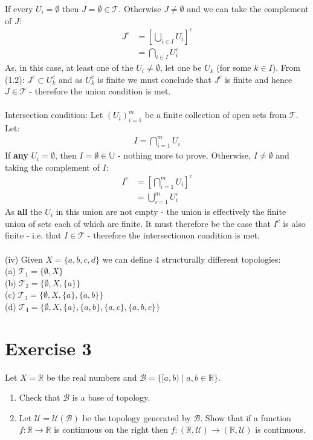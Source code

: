 \documentclass[12pt]{article}
\begin{document}
If every $U_i = \emptyset$ then $J= \emptyset \in \mathcal{T}$.  Otherwise $J \ne \emptyset$ and we can take the complement of $J$:
\begin{align*}
J^c &= \left[\bigcup_{i \in I} U_i\right]^c \\
&=\bigcap_{i \in I} U_i^c \tag{1.2}
\end{align*}
As, in this case, at least one of the $U_i \ne \emptyset$, let one be $U_k$ (for some $k \in I$).  From (1.2): $J^c \subset U_k^c$ and as $U_k^c$ is 
finite we must conclude that $J^c$ is finite and hence $J \in \mathcal{T}$ - therefore the union condition is met.\\
\\
Intersection condition: Let $(U_i)_{i=1}^m$ be a finite collection of open sets from $\mathcal{T}$.  Let:
\begin{align*}
I = \bigcap_{i=1}^m U_i \tag{1.2}
\end{align*}
If \textbf{any} $U_i = \emptyset$, then $I=\emptyset \in \mathbb{U}$ - nothing more to prove.  Otherwise, $I \ne \emptyset$ and taking the complement of $I$:
\begin{align*}
I^c &= \left[\bigcap_{i=1}^m U_i \right]^c \\
&= \bigcup_{i=1}^m U_i^c
\end{align*}
As \textbf{all} the $U_i$ in this union are not empty - the union is effectively the finite union of sets each of which are finite.
It must therefore be the case that $I^c$ is also finite - i.e. that $I \in \mathcal{T}$ - therefore the intersectionon condition is met.\\
\\
(iv) Given $X=\{a,b,c,d\}$ we can define 4 structurally different topologies:\\
(a) $\mathcal{T}_1 =\{\emptyset, X\}$\\
(b) $\mathcal{T}_2 =\{\emptyset, X, \{a\}\}$\\
(c) $\mathcal{T}_3 =\{\emptyset, X, \{a\}, \{a,b\}\}$\\
(d) $\mathcal{T}_4 =\{\emptyset, X, \{a\}, \{a,b\}, \{a,c\}, \{a,b,c\}\}$

\newpage
\noindent
\section*{Exercise 3}
Let \(X=\mathbb{R}\) be the real numbers and
\(\mathcal{B}=\{[a,b)\mid a,b\in\mathbb{R}\}\).

\begin{enumerate}
\item[i)] Check that \(\mathcal{B}\) is a base of topology.

\item[ii)] Let \(\mathcal{U}=\mathcal{U}(\mathcal{B})\) be the topology
generated by \(\mathcal{B}\). Show that if a function
\(f:\mathbb{R}\longrightarrow\mathbb{R}\) is continuous on the right
then \(f:(\mathbb{R},\mathcal{U})\longrightarrow
(\mathbb{R},\mathcal{U})\) is continuous.
\end{enumerate}
\end{document}
